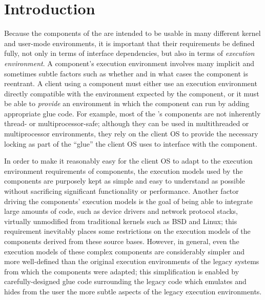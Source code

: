 %
% 
%
\section{Introduction}

Because the components of the \oskit{}
are intended to be usable in many different kernel and user-mode environments,
it is important that their requirements be defined fully,
not only in terms of interface dependencies,
but also in terms of \emph{execution environment}.
A component's execution environment
involves many implicit and sometimes subtle factors
such as whether and in what cases the component is reentrant.
A client using a component
must either use an execution environment
directly compatible with the environment expected by the component,
or it must be able to \emph{provide} an environment
in which the component can run
by adding appropriate glue code.
For example, most of the \oskit's components
are not inherently thread- or multiprocessor-safe;
although they can be used in multithreaded or multiprocessor environments,
they rely on the client OS to provide the necessary locking
as part of the ``glue'' the client OS uses to interface with the component.

In order to make it reasonably easy for the client OS
to adapt to the execution environment requirements of \oskit{} components,
the execution models used by the \oskit{} components
are purposely kept as simple and easy to understand as possible
without sacrificing significant functionality or performance.
Another factor driving the \oskit{} components' execution models
is the goal of being able to integrate large amounts of code,
such as device drivers and network protocol stacks,
virtually unmodified from traditional kernels such as BSD and Linux;
this requirement inevitably places some restrictions
on the execution models of the \oskit{} components
derived from these source bases.
However, in general,
even the execution models of these complex \oskit{} components
are considerably simpler and more well-defined
than the original execution environments
of the legacy systems from which the components were adapted;
this simplification is enabled
by carefully-designed \oskit{} glue code surrounding the legacy code
which emulates and hides from the \oskit{} user
the more subtle aspects of the legacy execution environments.

